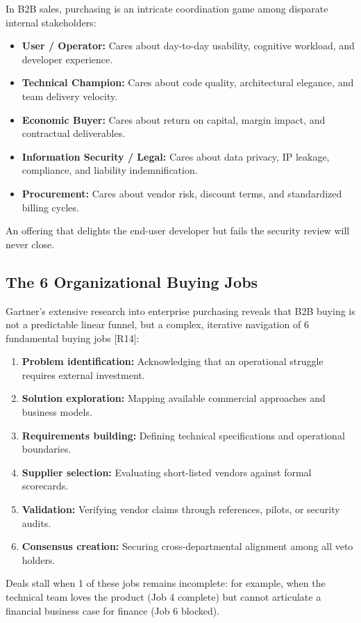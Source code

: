 In B2B sales, purchasing is an intricate coordination game among disparate internal stakeholders:
\begin{itemize}[leftmargin=1.2em,itemsep=0.2ex]
  \item \textbf{User / Operator:} Cares about day-to-day usability, cognitive workload, and developer experience.
  \item \textbf{Technical Champion:} Cares about code quality, architectural elegance, and team delivery velocity.
  \item \textbf{Economic Buyer:} Cares about return on capital, margin impact, and contractual deliverables.
  \item \textbf{Information Security / Legal:} Cares about data privacy, IP leakage, compliance, and liability indemnification.
  \item \textbf{Procurement:} Cares about vendor risk, discount terms, and standardized billing cycles.
\end{itemize}
An offering that delights the end-user developer but fails the security review will never close.

\subsection{The 6 Organizational Buying Jobs}

Gartner's extensive research into enterprise purchasing reveals that B2B buying is not a predictable linear funnel, but a complex, iterative navigation of 6 fundamental buying jobs [R14]:
\begin{enumerate}[leftmargin=1.2em,itemsep=0.2ex]
  \item \textbf{Problem identification:} Acknowledging that an operational struggle requires external investment.
  \item \textbf{Solution exploration:} Mapping available commercial approaches and business models.
  \item \textbf{Requirements building:} Defining technical specifications and operational boundaries.
  \item \textbf{Supplier selection:} Evaluating short-listed vendors against formal scorecards.
  \item \textbf{Validation:} Verifying vendor claims through references, pilots, or security audits.
  \item \textbf{Consensus creation:} Securing cross-departmental alignment among all veto holders.
\end{enumerate}
Deals stall when 1 of these jobs remains incomplete: for example, when the technical team loves the product (Job 4 complete) but cannot articulate a financial business case for finance (Job 6 blocked).

